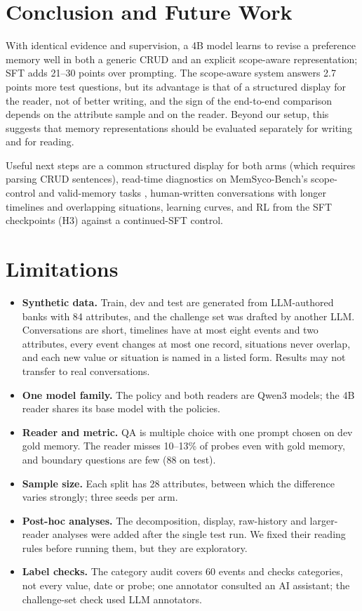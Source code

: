 \documentclass[11pt]{article}
\begin{document}
\section{Conclusion and Future Work}
With identical evidence and supervision, a 4B model learns to revise a preference memory well in both a generic CRUD and an explicit scope-aware representation; SFT adds 21--30 points over prompting. The scope-aware system answers 2.7 points more test questions, but its advantage is that of a structured display for the reader, not of better writing, and the sign of the end-to-end comparison depends on the attribute sample and on the reader. Beyond our setup, this suggests that memory representations should be evaluated separately for writing and for reading.

Useful next steps are a common structured display for both arms (which requires parsing CRUD sentences), read-time diagnostics on MemSyco-Bench's scope-control and valid-memory tasks \citep{xiang2026memsyco}, human-written conversations with longer timelines and overlapping situations, learning curves, and RL from the SFT checkpoints (H3) against a continued-SFT control.

\section*{Limitations}
\begin{itemize}
\item \textbf{Synthetic data.} Train, dev and test are generated from LLM-authored banks with 84 attributes, and the challenge set was drafted by another LLM. Conversations are short, timelines have at most eight events and two attributes, every event changes at most one record, situations never overlap, and each new value or situation is named in a listed form. Results may not transfer to real conversations.
\item \textbf{One model family.} The policy and both readers are Qwen3 models; the 4B reader shares its base model with the policies.
\item \textbf{Reader and metric.} QA is multiple choice with one prompt chosen on dev gold memory. The reader misses 10--13\% of probes even with gold memory, and boundary questions are few (88 on test).
\item \textbf{Sample size.} Each split has 28 attributes, between which the difference varies strongly; three seeds per arm.
\item \textbf{Post-hoc analyses.} The decomposition, display, raw-history and larger-reader analyses were added after the single test run. We fixed their reading rules before running them, but they are exploratory.
\item \textbf{Label checks.} The category audit covers 60 events and checks categories, not every value, date or probe; one annotator consulted an AI assistant; the challenge-set check used LLM annotators.
\end{itemize}
\end{document}
